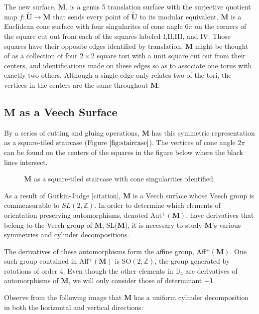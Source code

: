 \documentclass[]{article}
\begin{document}
The new surface, $\mathbf M$, is a genus 5 translation surface with the surjective quotient map $f:\tilde{\mathbf{U}}\rightarrow\mathbf M$ that sends every point of $\tilde{\mathbf{U}}$ to its modular equivalent. $\mathbf M$ is a Euclidean cone surface with four singularites of cone angle $6\pi$ on the corners of the square cut out from each of the squares labeled I,II,III, and IV. Those squares have their opposite edges identified by translation. $\mathbf M$ might be thought of as a collection of four $2\times2$ square tori with a unit square cut out from their centers, and identifications made on these edges so as to associate one torus with exactly two others. Although a single edge only relates two of the tori, the vertices in the centers are the same throughout $\mathbf M$.
\newpage

\subsection{$\mathbf M$ as a Veech Surface}
By a series of cutting and gluing operations, $\mathbf M$ has this symmetric representation as a square-tiled staircase (Figure $\ref{fig:staircase}$). The vertices of cone angle $2\pi$ can be found on the centers of the squares in the figure below where the black lines intersect. 
\begin{figure}[H]
\centering

\caption{$\mathbf{M}$ as a square-tiled staircase with cone singularities identified.}
\label{fig:staircase}
\end{figure}
As a result of Gutkin-Judge [citation], $\mathbf M$ is a Veech surface whose Veech group is commensurable to $SL(2,\mathbb Z)$. In order to determine which elements of orientation preserving automorphisms, denoted Aut$^{+}(\mathbf M)$, have derivatives that belong to the Veech group of $\mathbf M$, SL($\mathbf M$), it is necessary to study $\mathbf M$'s various symmetries and cylinder decompositions.

The derivatives of these automorphisms form the affine group, Aff$^+(\mathbf M)$. One such group contained in Aff$^+(\mathbf M)$ is SO$(2,\mathbb{Z})$, the group generated by rotations of order 4. Even though the other elements in $\mathbb{D}_4$ are derivatives of automorphisms of $\mathbf M$, we will only consider those of determinant +1.

Observe from the following image that $\mathbf M$ has a uniform cylinder decomposition in both the horizontal and vertical directions:
\end{document}

